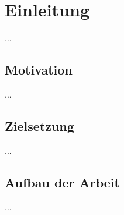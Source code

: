 \chapter{Einleitung}

...

\section{Motivation}

...

\section{Zielsetzung}

...

\section{Aufbau der Arbeit}

...
